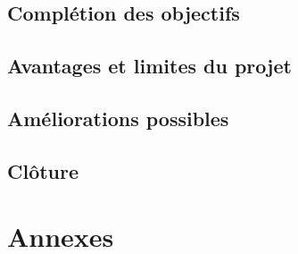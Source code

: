 \documentclass[a4paper, 12pt]{report}
\begin{document}
    \section{Complétion des objectifs}
    \section{Avantages et limites du projet}
    \section{Améliorations possibles}
    \section{Clôture}

\chapter{Annexes}
\minitoc
{}
\clearpage            

\appendix
\end{document}
